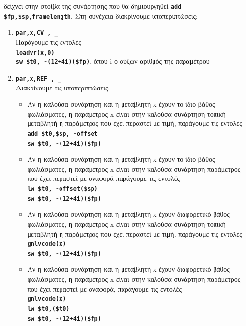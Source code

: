 \documentclass[a4paper]{article}
\let\OldTexttt\texttt
\renewcommand{\texttt}[1]{\OldTexttt{\textbf{#1}}}
\begin{document}
\begin{enumerate}
        δείχνει στην στοίβα της συνάρτησης που θα δημιουργηθεί \texttt{add
        \$fp,\$sp,framelength}. Στη συνέχεια διακρίνουμε υποπεριπτώσεις:
    \begin{enumerate}
        \item \texttt{par,x,CV , \_} \\ Παράγουμε τις εντολές \\
            \texttt{loadvr(x,0) \\ sw \$t0, -(12+4i)(\$fp)}, όπου i ο αύξων
            αριθμός της παραμέτρου
        \item \texttt{par,x,REF , \_} \\ Διακρίνουμε τις υποπεριπτώσεις:
            \begin{itemize}
                \item Αν η καλούσα συνάρτηση και η μεταβλητή x έχουν το
                    ίδιο βάθος φωλιάσματος, η παράμετρος x είναι στην
                    καλούσα συνάρτηση τοπική μεταβλητή ή παράμετρος που
                    έχει περαστεί με τιμή, παράγουμε τις εντολές \\
                    \texttt{add \$t0,\$sp, -offset \\ sw \$t0,
                    -(12+4i)(\$fp)} 
                \item Αν η καλούσα συνάρτηση και η μεταβλητή x έχουν το
                    ίδιο βάθος φωλιάσματος, η παράμετρος x είναι στην
                    καλούσα συνάρτηση παράμετρος που έχει περαστεί με
                    αναφορά παράγουμε τις εντολές \\ \texttt{lw \$t0,
                    -offset(\$sp) \\ sw \$t0, -(12+4i)(\$fp)}
                \item Αν η καλούσα συνάρτηση και η μεταβλητή x έχουν
                    διαφορετικό βάθος φωλιάσματος, η παράμετρος x είναι
                    στην καλούσα συνάρτηση τοπική μεταβλητή ή παράμετρος
                    που έχει περαστεί με τιμή, παράγουμε τις εντολές \\ 
                    \texttt{gnlvcode(x) \\ sw \$t0, -(12+4i)(\$fp)}
                \item Αν η καλούσα συνάρτηση και η μεταβλητή x έχουν
                    διαφορετικό βάθος φωλιάσματος, η παράμετρος x είναι
                    στην καλούσα συνάρτηση παράμετρος που έχει περαστεί με
                    αναφορά, παράγουμε τις εντολές \\ \texttt{gnlvcode(x)
                    \\ lw \$t0,(\$t0) \\ sw \$t0, -(12+4i)(\$fp)}

\end{itemize}
\end{enumerate}
\end{enumerate}
\end{document}
